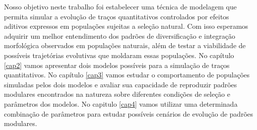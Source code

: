 Nosso objetivo neste trabalho foi estabelecer uma técnica de modelagem
que permita simular a evolução de traços quantitativos controlados
por efeitos aditivos expressos em populações sujeitas a seleção natural. 
Com isso esperamos adquirir um melhor entendimento dos padrões de
diversificação e integração morfológica observados em populações
naturais, além de testar a viabilidade de possíveis trajetórias
evolutivas que moldaram essas populações. 
No capítulo \ref{cap2} vamos apresentar dois modelos possíveis para a
simulação de traços quantitativos. 
No capítulo \ref{cap3} vamos estudar o comportamento de populações
simuladas pelos dois modelos e avaliar sua capacidade de reproduzir
padrões modulares encontrados na natureza sobre diferentes condições de
seleção e parâmetros dos modelos. 
No capitulo \ref{cap4} vamos utilizar uma determinada combinação de
parâmetros para estudar possíveis cenários de evolução de padrões
modulares. 

